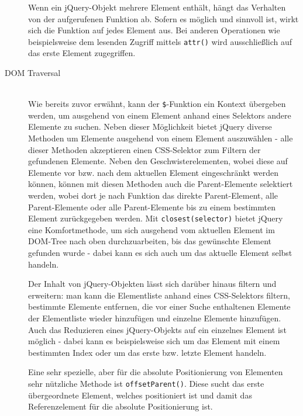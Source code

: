 \begin{description}
Wenn ein jQuery-Objekt mehrere Element enthält, hängt das Verhalten von der aufgerufenen Funktion
ab. Sofern es möglich und sinnvoll ist, wirkt sich die Funktion auf jedes Element aus. Bei anderen
Operationen wie beispielsweise dem lesenden Zugriff mittels \lstinline{attr()} wird ausschließlich
auf das erste Element zugegriffen.

\item[DOM Traversal] \hfill \\
Wie bereits zuvor erwähnt, kann der \lstinline{$}-Funktion ein Kontext übergeben werden, um
ausgehend von einem Element anhand eines Selektors andere Elemente zu suchen. Neben dieser
Möglichkeit bietet jQuery diverse Methoden um Elemente ausgehend von einem Element auszuwählen -
alle dieser Methoden akzeptieren einen CSS-Selektor zum Filtern der gefundenen Elemente. Neben den
Geschwisterelementen, wobei diese auf Elemente vor bzw. nach dem aktuellen Element eingeschränkt
werden können, können mit diesen Methoden auch die Parent-Elemente selektiert werden, wobei dort je
nach Funktion das direkte Parent-Element, alle Parent-Elemente oder alle Parent-Elemente bis zu
einem bestimmten Element zurückgegeben werden. Mit \lstinline{closest(selector)} bietet jQuery eine
Komfortmethode, um sich ausgehend vom aktuellen Element im DOM-Tree nach oben durchzuarbeiten, bis
das gewünschte Element gefunden wurde - dabei kann es sich auch um das aktuelle Element selbst
handeln.

Der Inhalt von jQuery-Objekten lässt sich darüber hinaus filtern und erweitern: man kann die
Elementliste anhand eines CSS-Selektors filtern, bestimmte Elemente entfernen, die vor einer
Suche enthaltenen Elemente der Elementliste wieder hinzufügen und einzelne Elemente hinzufügen. Auch
das Reduzieren eines jQuery-Objekts auf ein einzelnes Element ist möglich - dabei kann es
beispielsweise sich um das Element mit einem bestimmten Index oder um das erste bzw. letzte Element
handeln.

Eine sehr spezielle, aber für die absolute Positionierung von Elementen sehr nützliche Methode ist
\lstinline{offsetParent()}. Diese sucht das erste übergeordnete Element, welches positioniert ist
und damit das Referenzelement für die absolute Positionierung ist.


\end{description}
